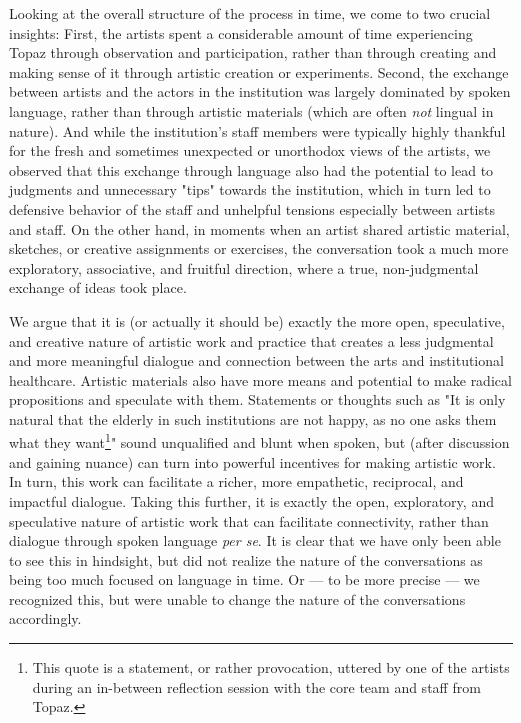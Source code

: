 \documentclass[authordate, empirical]{jote-new-article}
\begin{document}
	Looking at the overall structure of the process in time, we come to two crucial insights: First, the artists spent a considerable amount of time experiencing Topaz through observation and participation, rather than through creating and making sense of it through artistic creation or experiments. Second, the exchange between artists and the actors in the institution was largely dominated by spoken language, rather than through artistic materials (which are often \emph{not} lingual in nature). And while the institution's staff members were typically highly thankful for the fresh and sometimes unexpected or unorthodox views of the artists, we observed that this exchange through language also had the potential to lead to judgments and unnecessary "tips" towards the institution, which in turn led to defensive behavior of the staff and unhelpful tensions especially between artists and staff. On the other hand, in moments when an artist shared artistic material, sketches, or creative assignments or exercises, the conversation took a much more exploratory, associative, and fruitful direction, where a true, non-judgmental exchange of ideas took place.







	We argue that it is (or actually it should be) exactly the more open, speculative, and creative nature of artistic work and practice that creates a less judgmental and more meaningful dialogue and connection between the arts and institutional healthcare. Artistic materials also have more means and potential to make radical propositions and speculate with them. Statements or thoughts such as "It is only natural that the elderly in such institutions are not happy, as no one asks them what they want\footnote{This quote is a statement, or rather provocation, uttered by one of the artists during an in-between reflection session with the core team and staff from Topaz.}" sound unqualified and blunt when spoken, but (after discussion and gaining nuance) can turn into powerful incentives for making artistic work. In turn, this work can facilitate a richer, more empathetic, reciprocal, and impactful dialogue. Taking this further, it is exactly the open, exploratory, and speculative nature of artistic work that can facilitate connectivity, rather than dialogue through spoken language \emph{per se}. It is clear that we have only been able to see this in hindsight, but did not realize the nature of the conversations as being too much focused on language in time. Or --- to be more precise --- we recognized this, but were unable to change the nature of the conversations accordingly.
\end{document}
